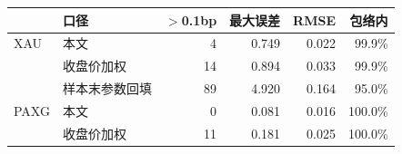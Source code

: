 \begin{tabular}{llrrrr}
\toprule
 & 口径 & $>$0.1bp & 最大误差 & RMSE & 包络内 \\
\midrule
XAU & 本文 & 4 & 0.749 & 0.022 & 99.9\% \\
 & 收盘价加权 & 14 & 0.894 & 0.033 & 99.9\% \\
 & 样本末参数回填 & 89 & 4.920 & 0.164 & 95.0\% \\
\midrule
PAXG & 本文 & 0 & 0.081 & 0.016 & 100.0\% \\
 & 收盘价加权 & 11 & 0.181 & 0.025 & 100.0\% \\
\bottomrule
\end{tabular}
